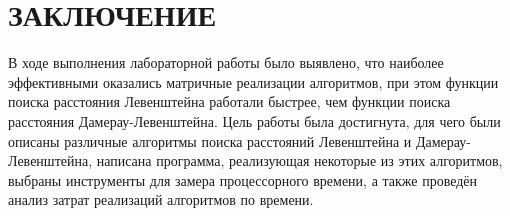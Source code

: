 \chapter*{ЗАКЛЮЧЕНИЕ}

В ходе выполнения лабораторной работы было выявлено, что наиболее эффективными оказались матричные реализации алгоритмов, при этом функции поиска расстояния Левенштейна работали быстрее, чем функции поиска расстояния Дамерау-Левенштейна. Цель работы была достигнута, для чего были описаны различные алгоритмы поиска расстояний Левенштейна и Дамерау-Левенштейна, написана программа, реализующая некоторые из этих алгоритмов, выбраны инструменты для замера процессорного времени, а также проведён анализ затрат реализаций алгоритмов по времени.